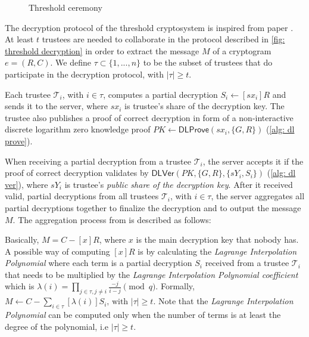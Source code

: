 \begin{figure}[ht]
    \caption{Threshold ceremony}
    \label{fig: threshold ceremony}
\end{figure}

\clearpage
The decryption protocol of the threshold cryptosystem is inspired from paper \cite{Desmedt89}. At least $t$ trustees are needed to collaborate in the protocol described in \cref{fig: threshold decryption} in order to extract the message $M$ of a cryptogram $e = (R, C)$. We define $\tau \subset \{ 1, ..., n \}$ to be the subset of trustees that do participate in the decryption protocol, with $|\tau| \geq t$. 

Each trustee $\mathcal{T}_i$, with $i \in \tau$, computes a partial decryption $S_i \gets [sx_i]R$ and sends it to the server, where $sx_i$ is trustee's share of the decryption key. The trustee also publishes a proof of correct decryption in form of a non-interactive discrete logarithm zero knowledge proof $PK \gets \mathsf{DLProve} (sx_i, \{ G, R \})$ (\cref{alg: dl prove}).

When receiving a partial decryption from a trustee $\mathcal{T}_i$, the server accepts it if the proof of correct decryption validates by $\mathsf{DLVer} (PK, \{ G, R \}, \{ sY_i, S_i \})$ (\cref{alg: dl ver}), where $sY_i$ is trustee's \textit{public share of the decryption key}. After it received valid, partial decryptions from all trustees $\mathcal{T}_i$, with $i \in \tau$, the server aggregates all partial decryptions together to finalize the decryption and to output the message $M$. The aggregation process from \cite{Desmedt89} is described as follows:

Basically, $M = C - [x]R$, where $x$ is the main decryption key that nobody has. A possible way of computing $[x]R$ is by calculating the \textit{Lagrange Interpolation Polynomial} where each term is a partial decryption $S_i$ received from a trustee $\mathcal{T}_i$ that needs to be multiplied by the \textit{Lagrange Interpolation Polynomial coefficient} which is $\lambda(i) = \prod_{j \in \tau, j \neq i} \frac{-j}{i-j} \pmod q$. Formally, $M \gets C - \sum_{i \in \tau} [\lambda(i)]S_i\text{, with } |\tau| \geq t$. Note that the \textit{Lagrange Interpolation Polynomial} can be computed only when the number of terms is at least the degree of the polynomial, i.e $|\tau| \geq t$.

